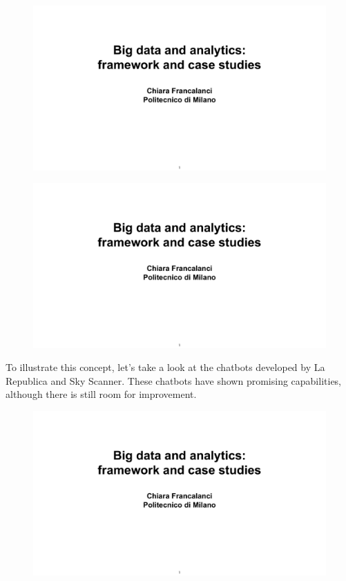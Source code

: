 \begin{figure}[!h]
  \centering
  \includegraphics[page=14, trim = 1.5cm 4cm 1.5cm 4.5cm, clip, width=\imagewidth]{images/06 - BIG_DATA.pdf}
\end{figure}

\begin{figure}[!h]
  \centering
  \includegraphics[page=15, trim = 1.5cm 3cm 1.5cm 5cm, clip, width=\imagewidth]{images/06 - BIG_DATA.pdf}
\end{figure}

To illustrate this concept, let's take a look at the chatbots developed
by La Republica and Sky Scanner. These chatbots have shown promising
capabilities, although there is still room for improvement.

\begin{figure}[!h]
  \centering
  \includegraphics[page=16, trim = 1.5cm 2cm 1.5cm 3.3cm, clip, width=\imagewidth]{images/06 - BIG_DATA.pdf}
\end{figure}

